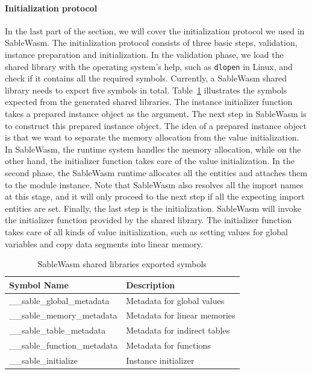 \paragraph{Initialization protocol}
In the last part of the section, we will cover the initialization protocol we used in SableWasm. The initialization protocol consists of three basic steps, validation, instance preparation and initialization. In the validation phase, we load the shared library with the operating system's help, such as \texttt{dlopen} in Linux, and check if it contains all the required symbols. Currently, a SableWasm shared library needs to export five symbols in total. Table~\ref{table:sablewasm-runtime-export-syms} illustrates the symbols expected from the generated shared libraries. The instance initializer function takes a prepared instance object as the argument. The next step in SableWasm is to construct this prepared instance object. The idea of a prepared instance object is that we want to separate the memory allocation from the value initialization. In SableWasm, the runtime system handles the memory allocation, while on the other hand, the initializer function takes care of the value initialization. In the second phase, the SableWasm runtime allocates all the entities and attaches them to the module instance. Note that SableWasm also resolves all the import names at this stage, and it will only proceed to the next step if all the expecting import entities are set. Finally, the last step is the initialization. SableWasm will invoke the initializer function provided by the shared library. The initializer function takes care of all kinds of value initialization, such as setting values for global variables and copy data segments into linear memory.

\begin{table}[h]
    \centering
    \begin{tabular}{|l|l|}
        \hline
        \textbf{Symbol Name}          & \textbf{Description}         \\ \hline
        \_\_sable\_global\_metadata   & Metadata for global values   \\ \hline
        \_\_sable\_memory\_metadata   & Metadata for linear memories \\ \hline
        \_\_sable\_table\_metadata    & Metadata for indirect tables \\ \hline
        \_\_sable\_function\_metadata & Metadata for functions       \\ \hline
        \_\_sable\_initialize         & Instance initializer         \\ \hline
    \end{tabular}
    \caption{SableWasm shared libraries exported symbols}
    \label{table:sablewasm-runtime-export-syms}
\end{table}